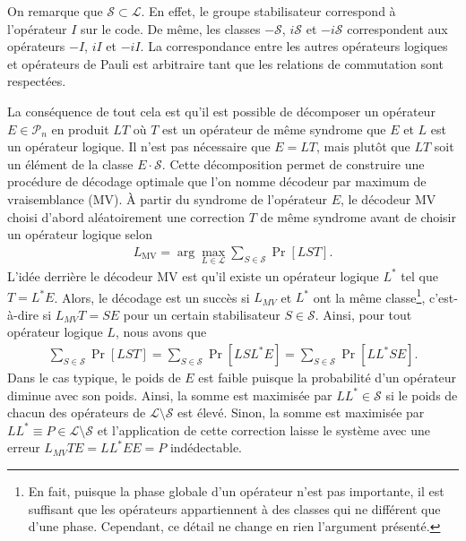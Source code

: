 On remarque que $\mathcal S \subset \mathcal L$.
En effet, le groupe stabilisateur correspond à l'opérateur $I$ sur le code.
De même, les classes $-\mathcal S$, $i\mathcal S$ et $-i\mathcal S$ correspondent
aux opérateurs $-I$, $iI$ et $-iI$.
La correspondance entre les autres opérateurs logiques et opérateurs de Pauli est
arbitraire tant que les relations de commutation sont respectées.

La conséquence de tout cela est qu'il est possible de décomposer un opérateur
$E \in \mathcal P_n$ en produit $LT$ où $T$ est un opérateur de même syndrome que $E$
et $L$ est un opérateur logique.
Il n'est pas nécessaire que $E = LT$, mais plutôt que $LT$ soit un élément de la classe $E \cdot \mathcal S$.
Cette décomposition permet de construire une procédure de décodage optimale que l'on 
nomme décodeur par maximum de vraisemblance (MV).
À partir du syndrome de l'opérateur $E$, 
le décodeur MV choisi d'abord aléatoirement une correction $T$ de même syndrome avant
de choisir un opérateur logique selon
\begin{align}
  L_{\text{MV}} = \arg\max_{L \in \mathcal L} \sum_{S \in \mathcal S} \Pr[LST].
\end{align}
L'idée derrière le décodeur MV est qu'il existe un opérateur logique $L^*$ tel que $T = L^*E$.
Alors, le décodage est un succès si $L_{MV}$ et $L^*$ ont la même classe\footnote{
  En fait, puisque la phase globale d'un opérateur n'est pas importante,
  il est suffisant que les opérateurs appartiennent à des classes qui ne différent
  que d'une phase.
  Cependant, ce détail ne change en rien l'argument présenté.
},
c'est-à-dire si $L_{MV}T = SE$ pour un certain stabilisateur $S \in \mathcal S$.
Ainsi, pour tout opérateur logique $L$, nous avons que 
\begin{align}
  \sum_{S\in \mathcal S} \Pr[LST]
  =
  \sum_{S\in \mathcal S} \Pr[LSL^*E]
  =
  \sum_{S\in \mathcal S} \Pr[LL^*SE].
\end{align}
Dans le cas typique,
le poids de $E$ est faible puisque la probabilité d'un opérateur diminue avec son poids.
Ainsi, la somme est maximisée par $LL^* \in \mathcal S$ si le poids de chacun des opérateurs de
$\mathcal L \setminus \mathcal S$ est élevé.
Sinon,
la somme est maximisée par $LL^* \equiv P \in \mathcal L \setminus \mathcal S$ 
et l'application de cette correction laisse le système avec une erreur $L_{MV}TE = LL^*EE = P$ indédectable.

